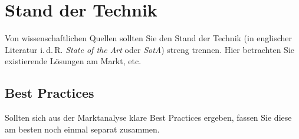 \section{Stand der Technik}\label{sec:RelatedWork:SotA}
Von wissenschaftlichen Quellen sollten Sie den Stand der Technik (in englischer Literatur i.\,d.\,R. \emph{State of the Art} oder \emph{SotA}) streng trennen. Hier betrachten Sie existierende Lösungen am Markt, etc.

\subsection{Best Practices}\label{subsec:RelatedWork:BestPractices}
Sollten sich aus der Marktanalyse klare Best Practices ergeben, fassen Sie diese am besten noch einmal separat zusammen.